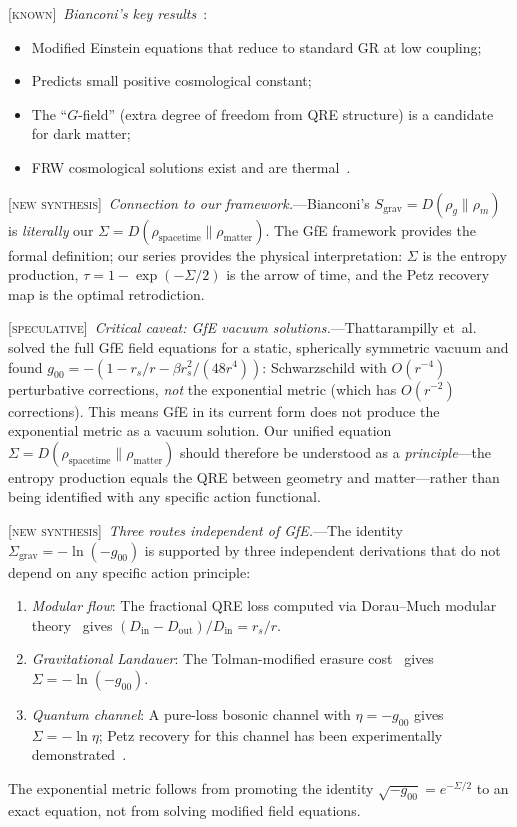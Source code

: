 \documentclass[prl,twocolumn,superscriptaddress,longbibliography,floatfix]{revtex4-2}
\newcommand{\tauasym}{\tau}
\newcommand{\known}{\textsc{[known]}}
\newcommand{\newsyn}{\textsc{[new synthesis]}}
\newcommand{\spec}{\textsc{[speculative]}}
\begin{document}
\known\ \emph{Bianconi's key results}~\cite{Bianconi2025,BianconiCosmology2025}:
\begin{itemize}
\item Modified Einstein equations that reduce to standard GR at
  low coupling;
\item Predicts small positive cosmological constant;
\item The ``$G$-field'' (extra degree of freedom from QRE structure)
  is a candidate for dark matter;
\item FRW cosmological solutions exist and are thermal~\cite{BianconiCosmology2025}.
\end{itemize}

\newsyn\ \emph{Connection to our framework.}---Bianconi's $S_{\mathrm{grav}}
= D(\rho_g \| \rho_m)$ is \emph{literally} our
$\Sigma = D(\rho_{\mathrm{spacetime}} \| \rho_{\mathrm{matter}})$.
The GfE framework provides the formal definition; our series
provides the physical interpretation: $\Sigma$ is the entropy
production, $\tauasym = 1 - \exp(-\Sigma/2)$ is the arrow of time,
and the Petz recovery map is the optimal retrodiction.

\spec\ \emph{Critical caveat: GfE vacuum solutions.}---Thattarampilly
et~al.~\cite{Thattarampilly2026} solved the full GfE field equations
for a static, spherically symmetric vacuum and found
$g_{00} = -(1 - r_s/r - \beta r_s^2/(48r^4))$: Schwarzschild with
$O(r^{-4})$ perturbative corrections, \emph{not} the exponential
metric (which has $O(r^{-2})$ corrections). This means GfE in its
current form does not produce the exponential metric as a vacuum
solution. Our unified equation $\Sigma = D(\rho_{\mathrm{spacetime}}
\| \rho_{\mathrm{matter}})$ should therefore be understood as
a \emph{principle}---the entropy production equals the QRE between
geometry and matter---rather than being identified with any
specific action functional.

\newsyn\ \emph{Three routes independent of GfE.}---The identity
$\Sigma_{\mathrm{grav}} = -\ln(-g_{00})$ is supported by three independent
derivations that do not depend on any specific action principle:
\begin{enumerate}
\item \emph{Modular flow}: The fractional QRE loss computed via
  Dorau--Much modular theory~\cite{DorauMuch2025} gives
  $(D_{\mathrm{in}} - D_{\mathrm{out}})/D_{\mathrm{in}} = r_s/r$.
\item \emph{Gravitational Landauer}: The Tolman-modified erasure
  cost~\cite{Herrera2020} gives $\Sigma = -\ln(-g_{00})$.
\item \emph{Quantum channel}: A pure-loss bosonic channel with
  $\eta = -g_{00}$ gives $\Sigma = -\ln\eta$; Petz recovery for
  this channel has been experimentally
  demonstrated~\cite{ChenSongScarani2025}.
\end{enumerate}
The exponential metric follows from promoting the identity
$\sqrt{-g_{00}} = e^{-\Sigma/2}$ to an exact equation, not from
solving modified field equations.
\end{document}
